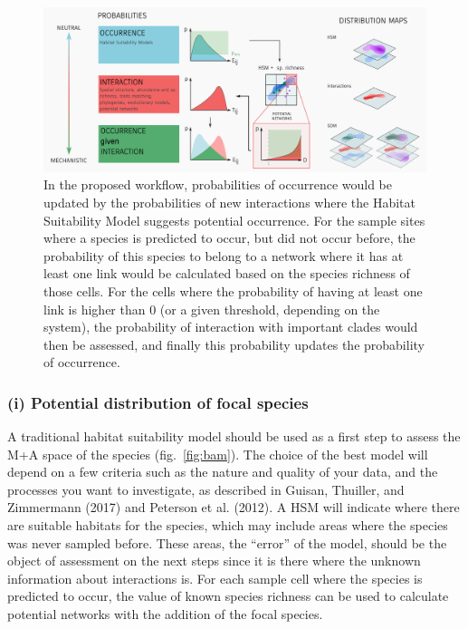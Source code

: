 \documentclass[11pt]{article}
\makeatletter
\def\maxwidth{\ifdim\Gin@nat@width>\linewidth\linewidth
\else\Gin@nat@width\fi}
\let\Oldincludegraphics\includegraphics
\renewcommand{\includegraphics}[1]{\Oldincludegraphics[width=\maxwidth]{#1}}
\makeatother
\begin{document}
\begin{figure}
\hypertarget{fig:synthesis}{%
\centering
\includegraphics{figures/conc_fig4_chapX.png}
\caption{In the proposed workflow, probabilities of occurrence would be
updated by the probabilities of new interactions where the Habitat
Suitability Model suggests potential occurrence. For the sample sites
where a species is predicted to occur, but did not occur before, the
probability of this species to belong to a network where it has at least
one link would be calculated based on the species richness of those
cells. For the cells where the probability of having at least one link
is higher than 0 (or a given threshold, depending on the system), the
probability of interaction with important clades would then be assessed,
and finally this probability updates the probability of
occurrence.}\label{fig:synthesis}
}
\end{figure}

\hypertarget{i-potential-distribution-of-focal-species}{%
\subsubsection{(i) Potential distribution of focal
species}\label{i-potential-distribution-of-focal-species}}

A traditional habitat suitability model should be used as a first step
to assess the M+A space of the species (fig.~\ref{fig:bam}). The choice
of the best model will depend on a few criteria such as the nature and
quality of your data, and the processes you want to investigate, as
described in Guisan, Thuiller, and Zimmermann (2017) and Peterson et al.
(2012). A HSM will indicate where there are suitable habitats for the
species, which may include areas where the species was never sampled
before. These areas, the ``error'' of the model, should be the object of
assessment on the next steps since it is there where the unknown
information about interactions is. For each sample cell where the
species is predicted to occur, the value of known species richness can
be used to calculate potential networks with the addition of the focal
species.
\end{document}
